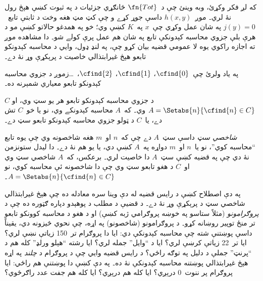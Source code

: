 \documentclass[../../../include/open-logic-section]{subfiles}
\begin{document}

که لږ فکر وکړئ، وبه وينئ چې د~$\fn{Tot}$ ځانګړي جزئيات د
 په ثبوت کښې هېڅ رول نۀ لري۔ موږ~$h(x,y)$
داسې جوړ کړے و چې کټ مټ هغه وخت د ثابتې تابع~$j(y) = 0$ په شان عمل
وکړي چې~$x$ په~$K$ کښې وي؛ خو په همدغو حالاتو کښې مو د هرې بلې
جزوي محاسبه کېدونکې تابع په شان هم عمل پرې کولے شو۔ دا مشاهده موږ ته
اجازه راکوي يوه لا عمومي قضيه بيان کړو چې، په لنډ ډول، وايي د محاسبه
کېدونکو تابعو هېڅ غيرابتذالي خاصيت د پرېکړې وړ نۀ دے۔

په ياد ولرئ چې~$\cfind{0}$، $\cfind{1}$، $\cfind{2}$،~\dots زموږ د
جزوي محاسبه کېدونکو تابعو معياري شمېرنه ده۔

\begin{thm}
  $C$ د جزوي محاسبه کېدونکو تابعو هر يو سټ وي، او $A =
  \Setabs{n}{\cfind{n} \in C}$ وي۔ که~$A$ محاسبه کېدونکے وي، نو يا
  خو~$C$ تش دے، يا~$C$ د ټولو جزوي محاسبه کېدونکو تابعو سټ دے۔
\end{thm}

\emph{شاخصي سټ} داسې سټ~$A$ دے چې که~$n$ او~$m$ هغه شاخصونه وي چې
يوه تابع ``محاسبه کوي''، نو يا~$n$ او~$m$ دواړه په~$A$ کښې دي، يا
يو هم نۀ دے۔ دا ليدل ستونزمن نۀ دي چې په قضيه کښې سټ~$A$ دا خاصيت
لري۔ برعکس، که~$A$ شاخصي سټ وي او~$C$ د هغو تابعو سټ وي چې دا
شاخصونه ئې محاسبه کوي، نو $A = \Setabs{n}{\cfind{n} \in C}$۔

\begin{explain}
په دې اصطلاح کښې د رايس قضيه له دې وينا سره معادله ده چې هېڅ
غيرابتذالي شاخصي سټ د پرېکړې وړ نۀ دے۔ د قضيې د مطلب د پوهېدو دپاره
ګټوره ده چې د \emph{پروګرامونو} (مثلاً ستاسو په خوښه پروګرامي ژبه
کښې) او د هغو د محاسبه کوونکو تابعو تر منځ توپير روښانه کړو۔ د
پروګرامونو (شاخصونو) په اړه، چې نحوي څيزونه دي، يقيناً داسې پوښتنې
شته چې محاسبه کېدونکې دي: ايا دا پروګرام تر~150 زياتې نښې لري؟ ايا
تر~22 زياتې کرښې لري؟ ايا د ``وايل'' جمله لري؟ ايا رشته ``هېلو
ورلډ'' کله هم د ``پرنټ'' جملې د دليل په توګه راځي؟ د رايس قضيه وايي
چې د پروګرام د \emph{چلند} په اړه هېڅ غيرابتذالي پوښتنه محاسبه
کېدونکې نۀ ده۔ په دې کښې دا پوښتنې هم راځي: ايا پروګرام پر ننوت~$0$
درېږي؟ ايا کله هم درېږي؟ ايا کله هم جفت عدد راګرځوي؟
\end{explain}
\end{document}

